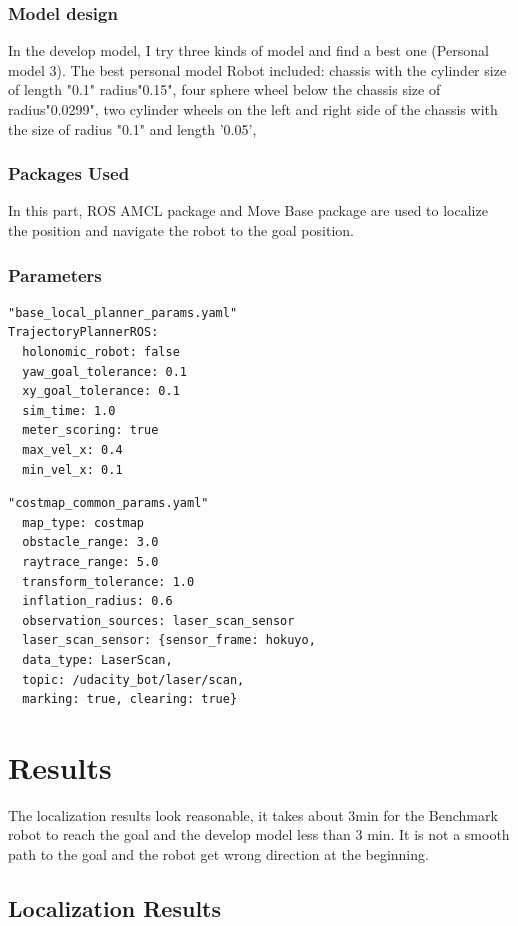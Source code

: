 \documentclass[10pt,journal,compsoc]{IEEEtran}
\begin{document}
\subsubsection{Model design}
In the develop model, I try three kinds of model and find a best one (Personal model 3).
The best personal model Robot included: chassis with the cylinder size of length "0.1" radius"0.15", four sphere wheel below the chassis size of  radius"0.0299", two cylinder wheels on the left and right side of the chassis with the size of radius "0.1" and length '0.05', 
\subsubsection{Packages Used}
In this part, ROS AMCL package and Move Base package are used to localize the position and navigate the robot to the goal position.

\subsubsection{Parameters}


\begin{lstlisting}
"base_local_planner_params.yaml"
TrajectoryPlannerROS:
  holonomic_robot: false
  yaw_goal_tolerance: 0.1
  xy_goal_tolerance: 0.1
  sim_time: 1.0
  meter_scoring: true 
  max_vel_x: 0.4
  min_vel_x: 0.1
\end{lstlisting}


\begin{lstlisting}
"costmap_common_params.yaml"
  map_type: costmap
  obstacle_range: 3.0
  raytrace_range: 5.0
  transform_tolerance: 1.0
  inflation_radius: 0.6
  observation_sources: laser_scan_sensor
  laser_scan_sensor: {sensor_frame: hokuyo, 
  data_type: LaserScan, 
  topic: /udacity_bot/laser/scan, 
  marking: true, clearing: true}

\end{lstlisting}


\section{Results}
The localization results look reasonable, it takes about 3min for the Benchmark robot to reach the goal and the develop model less than 3 min.  It is not a smooth path to the goal and the robot get wrong direction at the beginning. 

\subsection{Localization Results}
\end{document}
